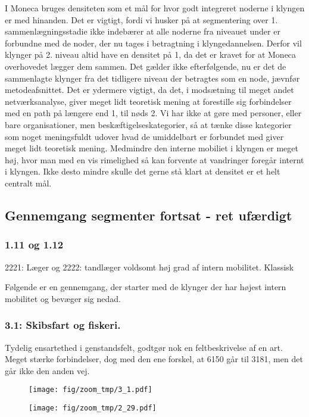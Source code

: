 I Moneca bruges densiteten som et mål for hvor godt integreret noderne i klyngen er med hinanden. Det er vigtigt, fordi vi husker på at segmentering over 1. sammenlægningsstadie ikke indebærer at alle noderne fra niveauet under er forbundne med de noder, der nu tages i betragtning i klyngedannelsen. Derfor vil klynger på 2. niveau altid have en densitet på 1, da det er kravet for at Moneca overhovedet lægger dem sammen. Det gælder ikke efterfølgende, nu er det de sammenlagte klynger fra det tidligere niveau der betragtes som en node, jævnfør metodeafsnittet. Det er ydermere vigtigt, da det, i modsætning til meget andet netværksanalyse, giver meget lidt teoretisk mening at forestille sig forbindelser med en path på længere end 1, til nøds 2. Vi har ikke at gøre med personer, eller bare organisationer, men beskæftigelseskategorier, så at tænke disse kategorier som noget meningsfuldt udover hvad de umiddelbart er forbundet med giver meget lidt teoretisk mening. Medmindre den interne mobiliet i klyngen er meget høj, hvor man med en vis rimelighed så kan forvente at vandringer foregår internt i klyngen. Ikke desto mindre skulle det gerne stå klart at densitet er et helt centralt mål.


\subsection{Gennemgang segmenter fortsat - ret ufærdigt}

\subsubsection{1.11 og 1.12}

2221: Læger og 2222: tandlæger voldsomt høj grad af intern mobilitet. Klassisk

Følgende er en gennemgang, der starter med de klynger der har højest intern mobilitet og bevæger sig nedad. 

\subsubsection{3.1: Skibsfart og fiskeri.}

Tydelig ensartethed i genstandsfelt, godtgør nok en feltbeskrivelse af en art. Meget stærke forbindelser, dog med den ene forskel, at 6150 går til 3181, men det går ikke den anden vej.
%
\begin{figure} \label{monecaeksempel1}
\parbox[H]{6cm}{\null
	\texttt{[image: fig/zoom\_tmp/3\_1.pdf]}
}
\parbox[H]{14cm}{\null
	\texttt{[image: fig/zoom\_tmp/2\_29.pdf]}
}
\end{figure}
%

